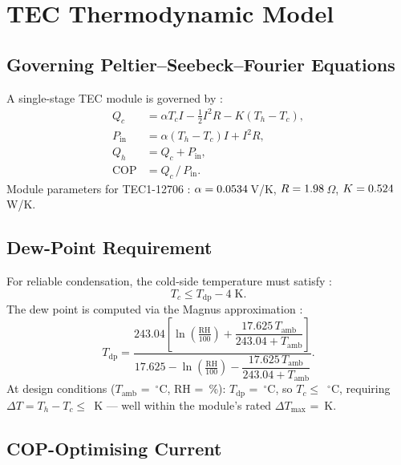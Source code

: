 \documentclass[12pt,a4paper]{report}
\numberwithin{equation}{chapter}
\numberwithin{figure}{chapter}
\numberwithin{table}{chapter}
\newcommand{\degC}{$^\circ$C}
\begin{document}
\section{TEC Thermodynamic Model}

\subsection{Governing Peltier--Seebeck--Fourier Equations}

A single-stage TEC module is governed by \cite{riffat2003peltier,zhao2022teccondenser}:
\begin{align}
  Q_c       &= \alpha T_c I - \tfrac{1}{2}I^2 R - K(T_h - T_c), \label{eq:6.4} \\
  P_\mathrm{in} &= \alpha(T_h - T_c)I + I^2 R,                  \label{eq:6.5} \\
  Q_h       &= Q_c + P_\mathrm{in},                              \label{eq:6.6} \\
  \mathrm{COP} &= Q_c \,/\, P_\mathrm{in}.                       \label{eq:6.7}
\end{align}
Module parameters for TEC1-12706 \cite{eslami2021tec}:
$\alpha = 0.0534$\,V/K, $R = 1.98$\,$\Omega$, $K = 0.524$\,W/K.

\subsection{Dew-Point Requirement}

For reliable condensation, the cold-side temperature must satisfy \cite{eslami2021tec}:
\begin{equation}
  T_c \leq T_\mathrm{dp} - 4\;\mathrm{K}.
  \label{eq:6.8}
\end{equation}
The dew point is computed via the Magnus approximation \cite{bagheri2024sec}:
\begin{equation}
  T_\mathrm{dp} = \frac{243.04\left[\ln\!\left(\frac{\mathrm{RH}}{100}\right)
    + \dfrac{17.625\,T_\mathrm{amb}}{243.04 + T_\mathrm{amb}}\right]}
    {17.625 - \ln\!\left(\frac{\mathrm{RH}}{100}\right)
    - \dfrac{17.625\,T_\mathrm{amb}}{243.04 + T_\mathrm{amb}}}.
  \label{eq:6.9}
\end{equation}
At design conditions ($T_\mathrm{amb}$ = \TambSummer\,\degC, RH = \RHdesign\,\%):
$T_\mathrm{dp}$ = \TdewDesign\,\degC, so $T_c \leq$ \TcoldDesign\,\degC,
requiring $\Delta T = T_h - T_c \leq$ \DTdesign\,K ---
well within the module's rated $\Delta T_\mathrm{max}$ = \TECDTmax\,K.

\subsection{COP-Optimising Current}
\end{document}
